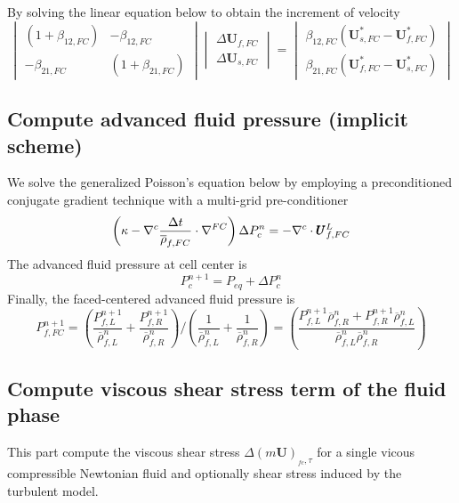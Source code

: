 \documentclass[preprint,12pt]{elsarticle}
\begin{document}
%
%
By solving the linear equation below to obtain the increment of velocity
%
\[ \begin{vmatrix} (1 + \beta_{12,FC})  &  -\beta_{12,FC} \\
                  -\beta_{21,FC}       &  (1 + \beta_{21,FC})
    \end{vmatrix}
    \begin{vmatrix} \Delta \pmb{U}_{f,FC} \\
                    \Delta \pmb{U}_{s,FC}
    \end{vmatrix}
    =
    \begin{vmatrix}  \beta_{12,FC}(\pmb{U}_{s,FC}^{*} - \pmb{U}_{f,FC}^{*}) \\
                    \beta_{21,FC}(\pmb{U}_{f,FC}^{*} - \pmb{U}_{s,FC}^{*})
    \end{vmatrix}                
\]
%
%
\subsection{\textsf{Compute advanced fluid pressure (implicit scheme)}}
We solve the generalized Poisson's equation below by employing a preconditioned conjugate gradient technique with a multi-grid pre-conditioner
%
\begin{equation}
  \left(  
   \kappa - \nabla^c \frac{\Delta{t}}{\overline{\rho}_{f,FC}} \cdot \nabla^{FC}
  \right) \Delta P_c^{n}
  = - \nabla^c \cdot \pmb{U}_{f,FC}^{L}
\end{equation}
%
%
The advanced fluid pressure at cell center is
%
\begin{equation}
  P_c^{n+1} = P_{eq} + \Delta P_c^{n}
\end{equation}
%
%
Finally, the faced-centered advanced fluid pressure is
%
%
\begin{equation}
    P_{f,FC}^{n+1} = (\frac{P_{f,L}^{n+1}}{\overline{\rho}_{f,L}^n} + \frac{P_{f,R}^{n+1}}{\overline{\rho}_{f,R}^n}) / (\frac{1}{\overline{\rho}_{f,L}^n} + \frac{1}{\overline{\rho}_{f,R}^n}) = (\frac{P_{f,L}^{n+1} \overline{\rho}_{f,R}^n + P_{f,R}^{n+1} \overline{\rho}_{f,L}^n}{\overline{\rho}_{f,L}^n \overline{\rho}_{f,R}^n})
\end{equation}
%
%
\subsection{\textsf{Compute viscous shear stress term of the fluid phase}}
This part compute the viscous shear stress $\Delta (m \pmb{U})_{_{fc},\tau}$ for a single vicous compressible Newtonian fluid and optionally shear stress induced by the turbulent model.
%
%
\end{document}
